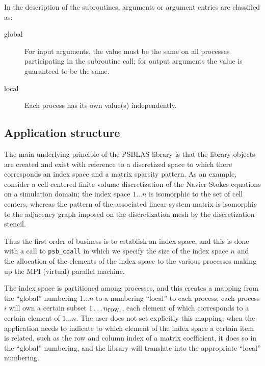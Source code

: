 In the description of the subroutines, arguments or argument entries
are classified as:
\begin{description}
\item[global] For input arguments, the value must be the same on all processes
  participating in the subroutine call; for output arguments the value
  is guaranteed to be the same.
\item[local] Each process has its own value(s) independently.
\end{description}

\subsection{Application structure}

The main underlying principle of the PSBLAS library is that the
library objects are created and exist with reference to a discretized
space to which there corresponds an index space and a matrix sparsity
pattern. As an example, consider a cell-centered finite-volume
discretization of  the Navier-Stokes equations on a simulation domain;
the index space $1\dots n$ is isomorphic to the set of cell centers,
whereas the pattern of the associated linear system matrix is
isomorphic to the adjacency graph imposed on the discretization mesh
by the discretization stencil. 

Thus the first order of business is to establish an index space, and
this is done with a call to  \verb|psb_cdall| in which we specify the
size of the index space $n$ and the allocation of the elements of the
index space to the various processes making up the MPI (virtual)
parallel machine. 

The index space is partitioned among processes, and this creates a
mapping from the ``global'' numbering $1\dots n$ to a numbering
``local'' to each process; each process $i$ will own a certain subset
$1\dots n_{\hbox{row}_i}$, each element of which corresponds to a certain
element of $1\dots n$. The user does not set explicitly this mapping;
when the application needs to indicate to which element of the index
space a certain item is related, such as the row and column index of a
matrix coefficient, it does so in the ``global'' numbering, and the
library will translate into the appropriate ``local'' numbering. 

